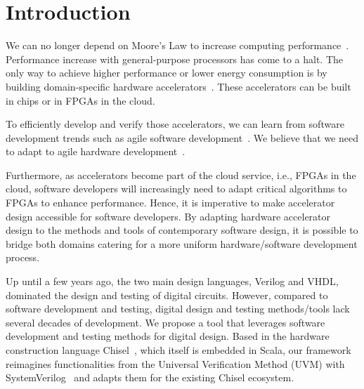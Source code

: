 \documentclass[conference]{IEEEtran}
\begin{document}
%
%


\section{Introduction}
\label{sec:introduction}

We can no longer depend on Moore's Law to increase computing performance~\cite{dark-silicon:2011}.
Performance increase with general-purpose processors has come to a halt.
The only way to achieve higher performance or lower energy consumption
is by building domain-specific hardware accelerators~\cite{domain-hw-acc:2020}.
These accelerators can be built in chips or in FPGAs in the cloud.

To efficiently develop and verify those accelerators, we can learn from software development trends such as agile software development~\cite{agile:manifesto}.
We believe that we need to adapt to agile hardware development~\cite{henn-patt:turing:2019}.

Furthermore, as accelerators become part of the cloud service, i.e., FPGAs in the cloud,
software developers will increasingly need to adapt critical algorithms to FPGAs to enhance performance.
Hence, it is imperative to make accelerator design accessible for software developers.
By adapting hardware accelerator design to the methods and tools of contemporary software design,
it is possible to bridge both domains catering for a more uniform hardware/software development process.

Up until a few years ago, the two main design languages, Verilog and VHDL, dominated the
design and testing of digital circuits.
However, compared to software development and testing, digital design and testing methods/tools 
lack several decades of development. We propose a tool that
leverages software development and testing methods for digital design.
Based in the hardware construction language Chisel~\cite{chisel:dac2012}, which itself is embedded in Scala,
our framework reimagines functionalities from the Universal Verification Method (UVM) with SystemVerilog~\cite{SystemVerilog} and
adapts them for the existing Chisel ecosystem.
\end{document}
